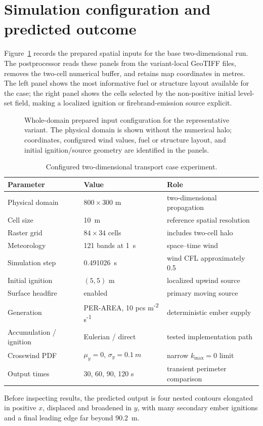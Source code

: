 \section{Simulation configuration and predicted outcome}

Figure~\ref{fig:input-configuration} records the prepared spatial inputs for the base two-dimensional run.
The postprocessor reads these panels from the variant-local GeoTIFF files, removes the
two-cell numerical buffer, and retains map coordinates in metres.  The left panel shows
the most informative fuel or structure layout available for the case; the right panel
shows the cells selected by the non-positive initial level-set field, making a localized
ignition or firebrand-emission source explicit.

\begin{figure}[H]
\centering
{}
\caption{Whole-domain prepared input configuration for the representative variant.  The
physical domain is shown without the numerical halo; coordinates, configured wind values,
fuel or structure layout, and initial ignition/source geometry are identified in the panels.}
\label{fig:input-configuration}
\end{figure}

\begin{table}[htbp]
\centering
\caption{Configured two-dimensional transport case experiment.}
\begin{tabular}{lll}\toprule
Parameter & Value & Role\\
\midrule
Physical domain & $800\times300$ m & two-dimensional propagation\\
Cell size & \SI{10}{m} & reference spatial resolution\\
Raster grid & $84\times34$ cells & includes two-cell halo\\
Meteorology & 121 bands at \SI{1}{s} & space--time wind\\
Simulation step & \SI{0.491026}{s} & wind CFL approximately 0.5\\
Initial ignition & $(5,5)$ m & localized upwind source\\
Surface headfire & enabled & primary moving source\\
Generation & PER-AREA, 10 pcs m\textsuperscript{-2} s\textsuperscript{-1} & deterministic ember supply\\
Accumulation / ignition & Eulerian / direct & tested implementation path\\
Crosswind PDF & $\mu_y=0$, $\sigma_y=\SI{0.1}{m}$ & narrow $k_{\max}=0$ limit\\
Output times & 30, 60, 90, 120 s & transient perimeter comparison\\
\bottomrule
\end{tabular}
\end{table}
Before inspecting results, the predicted output is four nested contours elongated in positive $x$, displaced and broadened in $y$, with many secondary ember ignitions and a final leading edge far beyond \SI{90.2}{m}.

